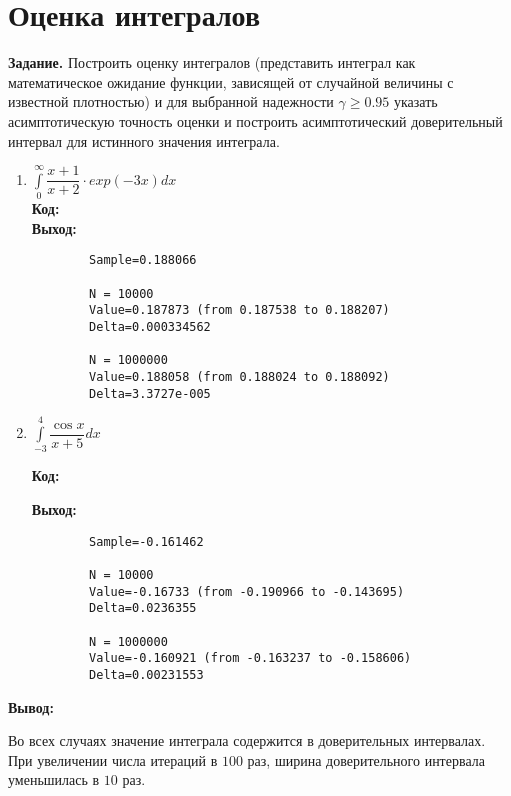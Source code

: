 \documentclass{article}
\begin{document}
	\section{Оценка интегралов}
	{\bf Задание.}
	Построить оценку интегралов (представить интеграл как математическое ожидание функции,
	зависящей от случайной величины с известной плотностью) и для выбранной надежности $\gamma \geqslant 0.95$ указать асимптотическую точность оценки и построить асимптотический доверительный интервал для истинного значения интеграла. 
	\begin{enumerate}
		\item ${\displaystyle \int\limits_0^{\infty}\dfrac{x+1}{x+2} \cdot exp(-3x) dx}$\\
		
		{\bf Код:}\\
		
		{\bf Выход:}
		
		\begin{lstlisting}
		Sample=0.188066
		
		N = 10000
		Value=0.187873 (from 0.187538 to 0.188207)
		Delta=0.000334562
		
		N = 1000000
		Value=0.188058 (from 0.188024 to 0.188092)
		Delta=3.3727e-005
		\end{lstlisting}
		\item ${\displaystyle \int\limits_{-3}^{4} \dfrac{\cos{x}}{x+5} dx}$
		
		{\bf Код:}
		
		
		
		{\bf Выход:}
		
		\begin{lstlisting}
		Sample=-0.161462
		
		N = 10000
		Value=-0.16733 (from -0.190966 to -0.143695)
		Delta=0.0236355
		
		N = 1000000
		Value=-0.160921 (from -0.163237 to -0.158606)
		Delta=0.00231553
		\end{lstlisting}
	\end{enumerate}

	\bigskip

	{\bf Вывод:}
	
	Во всех случаях значение интеграла содержится в доверительных интервалах.
	При увеличении числа итераций в $100$ раз, ширина доверительного интервала уменьшилась в $10$ раз.
\end{document}
